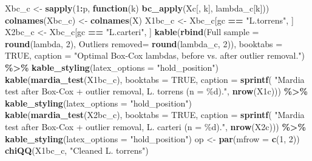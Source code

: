 \documentclass[
  11pt,
]{article}
\newenvironment{Shaded}{\begin{snugshade}}{\end{snugshade}}
\newcommand{\AttributeTok}[1]{\textcolor[rgb]{0.13,0.29,0.53}{#1}}
\newcommand{\ConstantTok}[1]{\textcolor[rgb]{0.56,0.35,0.01}{#1}}
\newcommand{\ControlFlowTok}[1]{\textcolor[rgb]{0.13,0.29,0.53}{\textbf{#1}}}
\newcommand{\DecValTok}[1]{\textcolor[rgb]{0.00,0.00,0.81}{#1}}
\newcommand{\FunctionTok}[1]{\textcolor[rgb]{0.13,0.29,0.53}{\textbf{#1}}}
\newcommand{\NormalTok}[1]{#1}
\newcommand{\OtherTok}[1]{\textcolor[rgb]{0.56,0.35,0.01}{#1}}
\newcommand{\SpecialCharTok}[1]{\textcolor[rgb]{0.81,0.36,0.00}{\textbf{#1}}}
\newcommand{\StringTok}[1]{\textcolor[rgb]{0.31,0.60,0.02}{#1}}
\begin{document}
\begin{Shaded}
\begin{Highlighting}[]
\NormalTok{Xbc\_c  }\OtherTok{\textless{}{-}} \FunctionTok{sapply}\NormalTok{(}\DecValTok{1}\SpecialCharTok{:}\NormalTok{p, }\ControlFlowTok{function}\NormalTok{(k) }\FunctionTok{bc\_apply}\NormalTok{(Xc[, k], lambda\_c[k]))}
\FunctionTok{colnames}\NormalTok{(Xbc\_c) }\OtherTok{\textless{}{-}} \FunctionTok{colnames}\NormalTok{(X)}
\NormalTok{X1bc\_c }\OtherTok{\textless{}{-}}\NormalTok{ Xbc\_c[gc }\SpecialCharTok{==} \StringTok{"L.torrens"}\NormalTok{, ]}
\NormalTok{X2bc\_c }\OtherTok{\textless{}{-}}\NormalTok{ Xbc\_c[gc }\SpecialCharTok{==} \StringTok{"L.carteri"}\NormalTok{, ]}
\FunctionTok{kable}\NormalTok{(}\FunctionTok{rbind}\NormalTok{(}\StringTok{\textasciigrave{}}\AttributeTok{Full sample}\StringTok{\textasciigrave{}}     \OtherTok{=} \FunctionTok{round}\NormalTok{(lambda,   }\DecValTok{2}\NormalTok{),}
            \StringTok{\textasciigrave{}}\AttributeTok{Outliers removed}\StringTok{\textasciigrave{}}\OtherTok{=} \FunctionTok{round}\NormalTok{(lambda\_c, }\DecValTok{2}\NormalTok{)),}
      \AttributeTok{booktabs =} \ConstantTok{TRUE}\NormalTok{,}
      \AttributeTok{caption =} \StringTok{"Optimal Box{-}Cox lambdas, before vs. after outlier removal."}\NormalTok{) }\SpecialCharTok{\%\textgreater{}\%}
  \FunctionTok{kable\_styling}\NormalTok{(}\AttributeTok{latex\_options =} \StringTok{"hold\_position"}\NormalTok{)}
\FunctionTok{kable}\NormalTok{(}\FunctionTok{mardia\_test}\NormalTok{(X1bc\_c), }\AttributeTok{booktabs =} \ConstantTok{TRUE}\NormalTok{,}
      \AttributeTok{caption =} \FunctionTok{sprintf}\NormalTok{(}
        \StringTok{"Mardia test after Box{-}Cox + outlier removal, L. torrens (n = \%d)."}\NormalTok{,}
        \FunctionTok{nrow}\NormalTok{(X1c))) }\SpecialCharTok{\%\textgreater{}\%}
  \FunctionTok{kable\_styling}\NormalTok{(}\AttributeTok{latex\_options =} \StringTok{"hold\_position"}\NormalTok{)}
\FunctionTok{kable}\NormalTok{(}\FunctionTok{mardia\_test}\NormalTok{(X2bc\_c), }\AttributeTok{booktabs =} \ConstantTok{TRUE}\NormalTok{,}
      \AttributeTok{caption =} \FunctionTok{sprintf}\NormalTok{(}
        \StringTok{"Mardia test after Box{-}Cox + outlier removal, L. carteri (n = \%d)."}\NormalTok{,}
        \FunctionTok{nrow}\NormalTok{(X2c))) }\SpecialCharTok{\%\textgreater{}\%}
  \FunctionTok{kable\_styling}\NormalTok{(}\AttributeTok{latex\_options =} \StringTok{"hold\_position"}\NormalTok{)}
\NormalTok{op }\OtherTok{\textless{}{-}} \FunctionTok{par}\NormalTok{(}\AttributeTok{mfrow =} \FunctionTok{c}\NormalTok{(}\DecValTok{1}\NormalTok{, }\DecValTok{2}\NormalTok{))}
\FunctionTok{chiQQ}\NormalTok{(X1bc\_c, }\StringTok{"Cleaned  L. torrens"}\NormalTok{)}

\end{Highlighting}
\end{Shaded}
\end{document}
